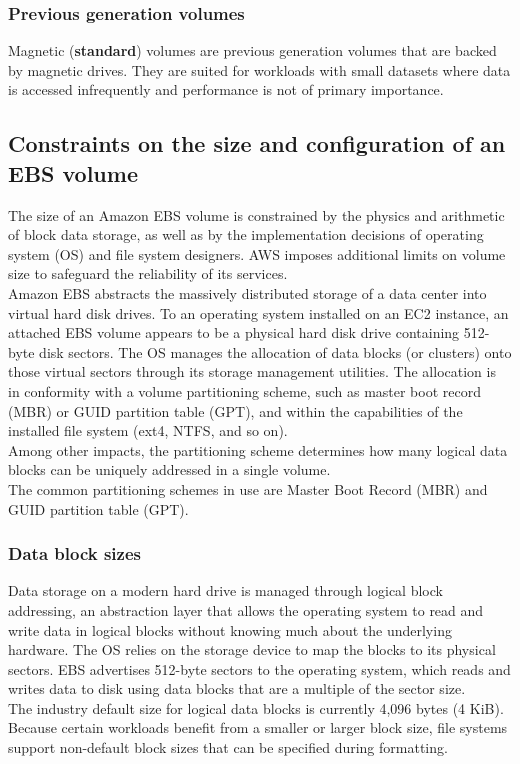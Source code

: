 \documentclass[12pt, letterpaper, twoside]{article}
\begin{document}
\subsubsection{Previous generation volumes}
Magnetic (\textbf{standard}) volumes are previous generation volumes that are backed by magnetic drives. They are suited for workloads with 
small datasets where data is accessed infrequently and performance is not of primary importance.

\subsection{Constraints on the size and configuration of an EBS volume}
The size of an Amazon EBS volume is constrained by the physics and arithmetic of block data storage, as well as by the implementation decisions 
of operating system (OS) and file system designers. AWS imposes additional limits on volume size to safeguard the reliability of its services.\\

Amazon EBS abstracts the massively distributed storage of a data center into virtual hard disk drives. To an operating system installed on an 
EC2 instance, an attached EBS volume appears to be a physical hard disk drive containing 512-byte disk sectors.
The OS manages the allocation of data blocks (or clusters) onto those virtual sectors through its storage management utilities. 
The allocation is in conformity with a volume partitioning scheme, such as master boot record (MBR) or GUID partition table (GPT), and within 
the capabilities of the installed file system (ext4, NTFS, and so on).\\

Among other impacts, the partitioning scheme determines how many logical data blocks can be uniquely addressed in a single volume.\\
The common partitioning schemes in use are Master Boot Record (MBR) and GUID partition table (GPT).\\

\subsubsection{Data block sizes}
Data storage on a modern hard drive is managed through logical block addressing, an abstraction layer that allows the operating system to read 
and write data in logical blocks without knowing much about the underlying hardware. The OS relies on the storage device to map the blocks to 
its physical sectors. EBS advertises 512-byte sectors to the operating system, which reads and writes data to disk using data blocks that are 
a multiple of the sector size.\\
The industry default size for logical data blocks is currently 4,096 bytes (4 KiB). Because certain workloads benefit from a smaller or larger 
block size, file systems support non-default block sizes that can be specified during formatting.\\
\end{document}

